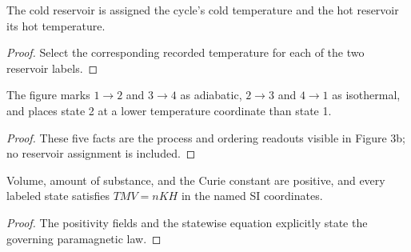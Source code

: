 \begin{definition}
  \label{def:physics:IPhO_2026_3_C_1:aux017}
  The cold reservoir is assigned the cycle's cold temperature and the hot
  reservoir its hot temperature.
\end{definition}
\begin{proof}
  Select the corresponding recorded temperature for each of the two
  reservoir labels.
\end{proof}

\begin{definition}
  \label{def:physics:IPhO_2026_3_C_1:aux018}
  The figure marks \(1\to2\) and \(3\to4\) as adiabatic,
  \(2\to3\) and \(4\to1\) as isothermal, and places state 2 at a
  lower temperature coordinate than state 1.
\end{definition}
\begin{proof}
  These five facts are the process and ordering readouts visible in Figure
  3b; no reservoir assignment is included.
\end{proof}

\begin{definition}
  \label{def:physics:IPhO_2026_3_C_1:aux019}
  Volume, amount of substance, and the Curie constant are positive, and every
  labeled state satisfies \(T M V=n K H\) in the named SI coordinates.
\end{definition}
\begin{proof}
  The positivity fields and the statewise equation explicitly state the
  governing paramagnetic law.
\end{proof}

